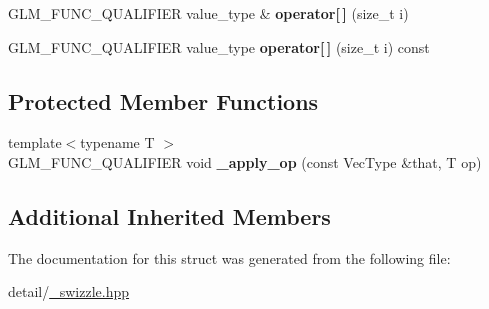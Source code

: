 \begin{DoxyCompactItemize}
\item 
\hypertarget{structglm_1_1detail_1_1__swizzle__base2_aa3f2ab8e3e1a5c414b3fdca4cf75b706}{G\-L\-M\-\_\-\-F\-U\-N\-C\-\_\-\-Q\-U\-A\-L\-I\-F\-I\-E\-R value\-\_\-type \& {\bfseries operator\mbox{[}$\,$\mbox{]}} (size\-\_\-t i)}\label{structglm_1_1detail_1_1__swizzle__base2_aa3f2ab8e3e1a5c414b3fdca4cf75b706}

\item 
\hypertarget{structglm_1_1detail_1_1__swizzle__base2_a1bec6727adac01b6bc3e1ccba935167e}{G\-L\-M\-\_\-\-F\-U\-N\-C\-\_\-\-Q\-U\-A\-L\-I\-F\-I\-E\-R value\-\_\-type {\bfseries operator\mbox{[}$\,$\mbox{]}} (size\-\_\-t i) const }\label{structglm_1_1detail_1_1__swizzle__base2_a1bec6727adac01b6bc3e1ccba935167e}

\end{DoxyCompactItemize}
\subsection*{Protected Member Functions}
\begin{DoxyCompactItemize}
\item 
\hypertarget{structglm_1_1detail_1_1__swizzle__base2_a11d049274a60ecf4aac8cebc4c4e9be5}{{\footnotesize template$<$typename T $>$ }\\G\-L\-M\-\_\-\-F\-U\-N\-C\-\_\-\-Q\-U\-A\-L\-I\-F\-I\-E\-R void {\bfseries \-\_\-apply\-\_\-op} (const Vec\-Type \&that, T op)}\label{structglm_1_1detail_1_1__swizzle__base2_a11d049274a60ecf4aac8cebc4c4e9be5}

\end{DoxyCompactItemize}
\subsection*{Additional Inherited Members}


The documentation for this struct was generated from the following file\-:\begin{DoxyCompactItemize}
\item 
detail/\hyperlink{__swizzle_8hpp}{\-\_\-swizzle.\-hpp}\end{DoxyCompactItemize}
